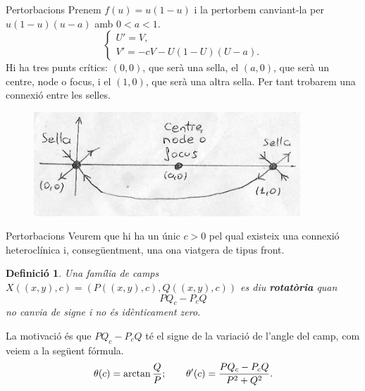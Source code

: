 \documentclass{beamer}
\newtheorem{definicio}{Definici\'{o}}
\theoremstyle{definition}
\begin{document}
\begin{frame}{Pertorbacions}
Prenem $f(u)=u(1-u)$ i la pertorbem canviant-la per $u(1-u)(u-a)$ amb $0<a<1$.
\pause
\[\left\{\begin{array}{l}U'=V,\\V'=-cV-U(1-U)(U-a).\end{array}\right.\]
\pause
Hi ha tres punts cr\'{i}tics: $(0,0)$, que ser\`{a} una sella, el $(a,0)$, que ser\`{a} un centre, node o focus, i el $(1,0)$, que ser\`{a} una altra sella. Per tant trobarem una connexi\'{o} entre les selles.
\begin{figure}[ht!]
\begin{center}
\includegraphics[width=10cm]{Critics.jpg}
\end{center}
\end{figure}
\end{frame}

\begin{frame}{Pertorbacions}
Veurem que hi ha un \'{u}nic $c>0$ pel qual existeix una connexi\'{o} heterocl\'{i}nica i, conseg\"{u}entment, una ona viatgera de tipus front.
\pause
\begin{definicio}
Una fam\'{i}lia de camps $X((x,y),c)=(P((x,y),c),Q((x,y),c))$ es diu \textbf{rotat\`{o}ria} quan
\[PQ_c-P_cQ\]
no canvia de signe i no \'{e}s id\`{e}nticament zero.
\end{definicio}
\pause
La motivaci\'{o} \'{e}s que $PQ_c-P_cQ$ t\'{e} el signe de la variaci\'{o} de l'angle del camp, com veiem a la seg\"{u}ent f\'{o}rmula.
\[\theta(c)=\arctan\frac{Q}{P};\hspace{7mm}\theta'(c)=\frac{PQ_c-P_cQ}{P^2+Q^2}.\]
\end{frame}
\end{document}
